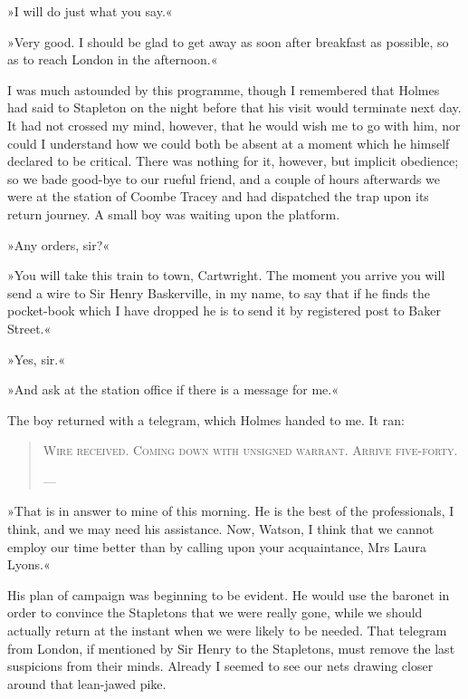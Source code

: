 »I will do just what you say.«

»Very good. I should be glad to get away as soon after breakfast as possible, so as to reach London in the afternoon.«

I was much astounded by this programme, though I re\-mem\-bered that Holmes had said to Stapleton on the night before that his visit would terminate next day. It had not crossed my mind, however, that he would wish me to go with him, nor could I understand how we could both be absent at a moment which he himself declared to be critical. There was nothing for it, however, but implicit obedience; so we bade good-bye to our rueful friend, and a couple of hours afterwards we were at the station of Coombe Tracey and had dispatched the trap upon its return journey. A small boy was waiting upon the platform.

»Any orders, sir?«

»You will take this train to town, Cartwright. The moment you arrive you will send a wire to Sir Henry Baskerville, in my name, to say that if he finds the pocket-book which I have dropped he is to send it by registered post to Baker Street.«

»Yes, sir.«

»And ask at the station office if there is a message for me.«

The boy returned with a telegram, which Holmes handed to me. It ran: 
\begin{samepage}
\blockquote{
\textsc{Wire received. Coming down with unsigned warrant. Arrive five-forty.}
\begin{flushright}
\allowbreak---
\end{flushright}
}
\end{samepage}

»That is in answer to mine of this morning. He is the best of the professionals, I think, and we may need his assistance. Now, Watson, I think that we cannot employ our time better than by calling upon your acquaintance, Mrs Laura Lyons.«

His plan of campaign was beginning to be evident. He would use the baronet in order to convince the Stapletons that we were really gone, while we should actually return at the instant when we were likely to be needed. That telegram from London, if mentioned by Sir Henry to the Stapletons, must remove the last suspicions from their minds. Already I seemed to see our nets drawing closer around that lean-jawed pike.

